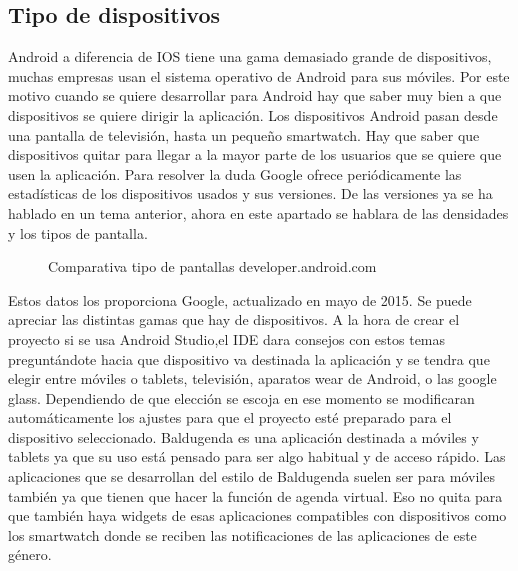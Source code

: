 \subsection{Tipo de dispositivos}
\label{subsecc:Tipo de dispositivos}

Android a diferencia de IOS tiene una gama demasiado grande de dispositivos, muchas empresas usan el sistema operativo de Android para sus móviles.
Por este motivo cuando se quiere desarrollar para Android hay que saber muy bien a que dispositivos se quiere dirigir la aplicación.
Los dispositivos Android pasan desde una pantalla de televisión, hasta un pequeño smartwatch.
Hay que saber que dispositivos quitar para llegar a la mayor parte de los usuarios que se quiere que usen la aplicación.
Para resolver la duda Google ofrece periódicamente las estadísticas de los dispositivos usados y sus versiones.
De las versiones ya se ha hablado en un tema anterior, ahora en este apartado se hablara de las densidades y los tipos de pantalla.

\begin{figure}[H] 
  \begin{center} 
    \caption{Comparativa tipo de pantallas developer.android.com} 
    \label{fig:ComparativaPantallas} 
  \end{center} 
\end{figure}

Estos datos los proporciona Google, actualizado en mayo de 2015.
Se puede apreciar las distintas gamas que hay de dispositivos. A la hora de crear el proyecto si se usa Android Studio,el IDE dara consejos con estos temas preguntándote hacia que dispositivo va destinada la aplicación y se tendra  que elegir entre móviles o tablets, televisión, aparatos wear de Android, o las google glass.
Dependiendo de que elección se escoja en ese momento se modificaran automáticamente los ajustes para que el proyecto esté preparado para el dispositivo seleccionado.
Baldugenda es una aplicación destinada a móviles y tablets ya que su uso está pensado para ser algo habitual y de acceso rápido.
Las aplicaciones que se desarrollan del estilo de Baldugenda suelen ser para móviles también ya que tienen que hacer la función de agenda virtual. Eso no quita para que también haya widgets de esas aplicaciones compatibles con dispositivos como los smartwatch donde se reciben las notificaciones de las aplicaciones de este género.

